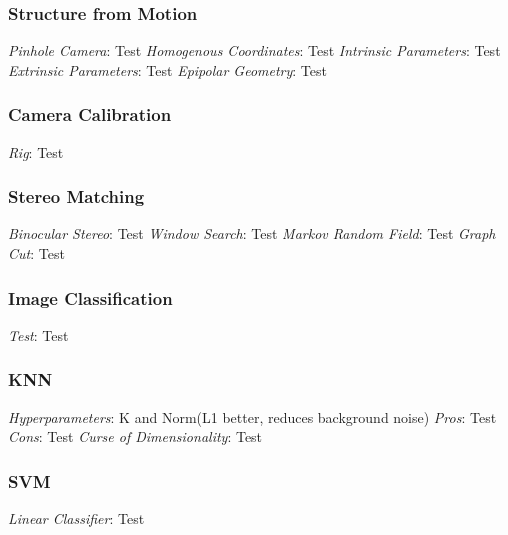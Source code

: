 \documentclass{article}
\author{Ian Chen}
\date{\today}
\begin{document}
    \begin{multicols*}{2}
        \subsubsection*{Structure from Motion}
        \textit{Pinhole Camera}: Test\newline
        \textit{Homogenous Coordinates}: Test\newline
        \textit{Intrinsic Parameters}: Test\newline
        \textit{Extrinsic Parameters}: Test\newline
        \textit{Epipolar Geometry}: Test\newline
        \subsubsection*{Camera Calibration}
        \textit{Rig}: Test\newline
        \subsubsection*{Stereo Matching}
        \textit{Binocular Stereo}: Test\newline
        \textit{Window Search}: Test\newline
        \textit{Markov Random Field}: Test\newline
        \textit{Graph Cut}: Test\newline
        \subsubsection*{Image Classification}
        \textit{Test}: Test\newline
        \subsubsection*{KNN}
        \textit{Hyperparameters}: K and Norm(L1 better, reduces background noise)\newline
        \textit{Pros}: Test\newline
        \textit{Cons}: Test\newline
        \textit{Curse of Dimensionality}: Test\newline
        \subsubsection*{SVM}
        \textit{Linear Classifier}: Test\newline

\end{multicols*}
\end{document}
